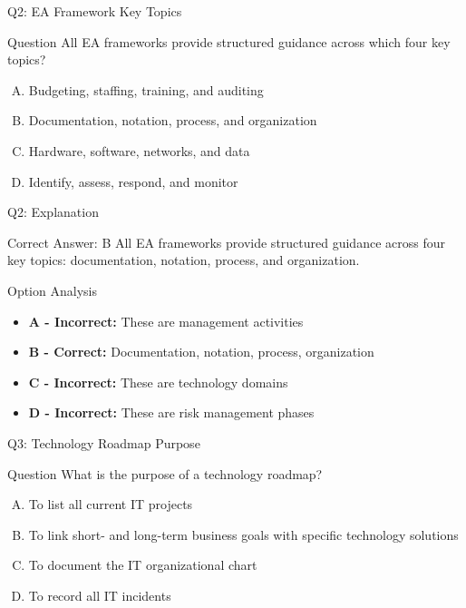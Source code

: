 \documentclass{beamer}
\begin{document}
	\begin{frame}{Q2: EA Framework Key Topics}
		\begin{block}{Question}
			All EA frameworks provide structured guidance across which four key topics?
		\end{block}
		\begin{enumerate}[(A)]
			\item Budgeting, staffing, training, and auditing
			\item Documentation, notation, process, and organization
			\item Hardware, software, networks, and data
			\item Identify, assess, respond, and monitor
		\end{enumerate}
	\end{frame}
	
	\begin{frame}{Q2: Explanation}
		\begin{block}{Correct Answer: B}
			All EA frameworks provide structured guidance across four key topics: documentation, notation, process, and organization.
		\end{block}
		\begin{block}{Option Analysis}
			\begin{itemize}
				\item \textbf{A - Incorrect:} These are management activities
				\item \textbf{B - Correct:} Documentation, notation, process, organization
				\item \textbf{C - Incorrect:} These are technology domains
				\item \textbf{D - Incorrect:} These are risk management phases
			\end{itemize}
		\end{block}
	\end{frame}
	
	\begin{frame}{Q3: Technology Roadmap Purpose}
		\begin{block}{Question}
			What is the purpose of a technology roadmap?
		\end{block}
		\begin{enumerate}[(A)]
			\item To list all current IT projects
			\item To link short- and long-term business goals with specific technology solutions
			\item To document the IT organizational chart
			\item To record all IT incidents
		\end{enumerate}
	\end{frame}
	
\end{document}
